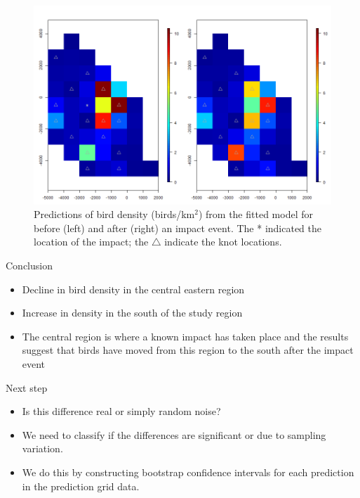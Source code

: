 \documentclass[11pt, a4paper]{article}
\begin{document}
\begin{figure}[h]
  \centering
  \includegraphics[width=12cm]{pointEstimate.png}
  \caption{Predictions of bird density (birds/km$^2$) from the fitted model for before (left) and after (right) an impact event. The * indicated the location of the impact; the $\triangle$ indicate the knot locations.}
  \label{fig:pointest}
\end{figure}
\begin{block}{Conclusion}
\begin{itemize}
  \item Decline in bird density in the central eastern region
  \item Increase in density in the south of the study region 
  \item The central region is where a known impact has taken place and the results suggest that birds have moved from this region to the south after the impact event
\end{itemize}
\end{block}

\begin{block}{Next step}
\begin{itemize}
  \item Is this difference real or simply random noise?
  \item We need to classify if the differences are significant or due to sampling variation.
  \item We do this by constructing bootstrap confidence intervals for each prediction in the prediction grid data.
\end{itemize}
\end{block}

\end{document}
